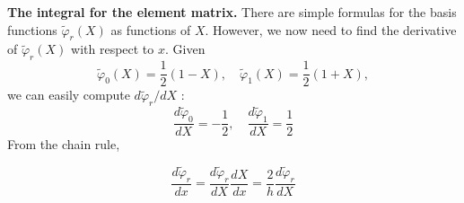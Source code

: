 \documentclass[../main.tex]{subfiles}
\begin{document}
	\textbf{The integral for the element matrix.  } There are simple formulas for the basis functions $\tilde{\varphi}_{r}(X)$ as functions of $X$. However, we now need to find the derivative of $\tilde{\varphi}_{r}(X)$ with respect to $x$. Given
	$$
	\tilde{\varphi}_{0}(X)=\frac{1}{2}(1-X), \quad \tilde{\varphi}_{1}(X)=\frac{1}{2}(1+X),
	$$
	we can easily compute $d \tilde{\varphi}_{r} / d X$ :
	$$
	\frac{d \tilde{\varphi}_{0}}{d X}=-\frac{1}{2}, \quad \frac{d \tilde{\varphi}_{1}}{d X}=\frac{1}{2}
	$$
	From the chain rule,
	
	\begin{equation}
		\label{eqa176}
		\frac{d \tilde{\varphi}_{r}}{d x}=\frac{d \tilde{\varphi}_{r}}{d X} \frac{d X}{d x}=\frac{2}{h} \frac{d \tilde{\varphi}_{r}}{d X}
	\end{equation}	
\end{document}
